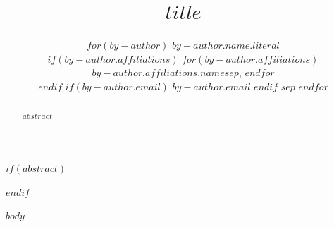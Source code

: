 \documentclass{article}
\title{$title$}
\author{
$for(by-author)$
  \textbf{$by-author.name.literal$} \\
  $if(by-author.affiliations)$
    $for(by-author.affiliations)$$by-author.affiliations.name$$sep$, $endfor$ \\
  $endif$
  $if(by-author.email)$
    \texttt{$by-author.email$}
  $endif$
  $sep$ \And
$endfor$
}
\begin{document}
\ifcolmsubmission
\linenumbers
\fi

\maketitle

$if(abstract)$
\begin{abstract}
$abstract$
\end{abstract}
$endif$

$body$
\end{document}

